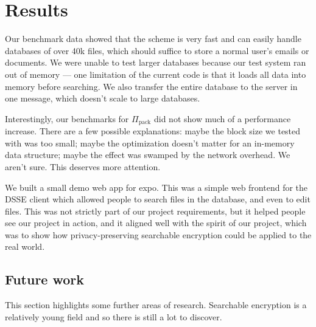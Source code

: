 \section{Results}


Our benchmark data showed that the scheme is very fast and can easily handle databases of over 40k files, which should suffice to store a normal user's emails or documents. We were unable to test larger databases because our test system ran out of memory --- one limitation of the current code is that it loads all data into memory before searching. We also transfer the entire database to the server in one message, which doesn't scale to large databases.

Interestingly, our benchmarks for $\Pi_\mathrm{pack}$ did not show much of a performance increase. There are a few possible explanations: maybe the block size we tested with was too small; maybe the optimization doesn't matter for an in-memory data structure; maybe the effect was swamped by the network overhead. We aren't sure. This deserves more attention.

We built a small demo web app for expo. This was a simple web frontend for the DSSE client which allowed people to search files in the database, and even to edit files. This was not strictly part of our project requirements, but it helped people see our project in action, and it aligned well with the spirit of our project, which was to show how privacy-preserving searchable encryption could be applied to the real world.

\subsection{Future work}

This section highlights some further areas of research. 
Searchable encryption is a relatively young field and so there is still a lot to discover.

